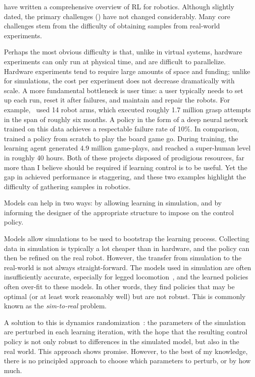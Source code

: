 \textcite{kober2013reinforcement} have written a comprehensive overview of RL for robotics. Although slightly dated, the primary challenges (\cite[cf. 8.1]{kober2013reinforcement}) have not changed considerably. Many core challenges stem from the difficulty of obtaining samples from real-world experiments. \par
Perhaps the most obvious difficulty is that, unlike in virtual systems, hardware experiments can only run at physical time, and are difficult to parallelize.
Hardware experiments tend to require large amounts of space and funding; unlike for simulations, the cost per experiment does not decrease dramatically with scale.
A more fundamental bottleneck is user time: a user typically needs to set up each run, reset it after failures, and maintain and repair the robots.
For example,~\textcite{levine2018learning} used 14 robot arms, which executed roughly 1.7 million grasp attempts in the span of roughly six months. A policy in the form of a deep neural network trained on this data achieves a respectable failure rate of 10\%.
In comparison,~\textcite{silver2017mastering} trained a policy from scratch to play the board game go. During training, the learning agent generated 4.9 million game-plays, and reached a super-human level in roughly 40 hours.
Both of these projects disposed of prodigious resources, far more than I believe should be required if learning control is to be useful. Yet the gap in achieved performance is staggering, and these two examples highlight the difficulty of gathering samples in robotics. \par
Models can help in two ways: by allowing learning in simulation, and by informing the designer of the appropriate structure to impose on the control policy.
 \par
Models allow simulations to be used to bootstrap the learning process. Collecting data in simulation is typically a lot cheaper than in hardware, and the policy can then be refined on the real robot. However, the transfer from simulation to the real-world is not always straight-forward.
The models used in simulation are often insufficiently accurate, especially for legged locomotion~\cite{neunert2017off,tan2018sim}, and the learned policies often over-fit to these models. In other words, they find policies that may be optimal (or at least work reasonably well) but are not robust. This is commonly known as the \emph{sim-to-real} problem. \par
A solution to this is dynamics randomization~\cite{peng2017sim,lowrey2018reinforcement,tan2018sim}: the parameters of the simulation are perturbed in each learning iteration, with the hope that the resulting control policy is not only robust to differences in the simulated model, but also in the real world. This approach shows promise. However, to the best of my knowledge, there is no principled approach to choose which parameters to perturb, or by how much. \par
